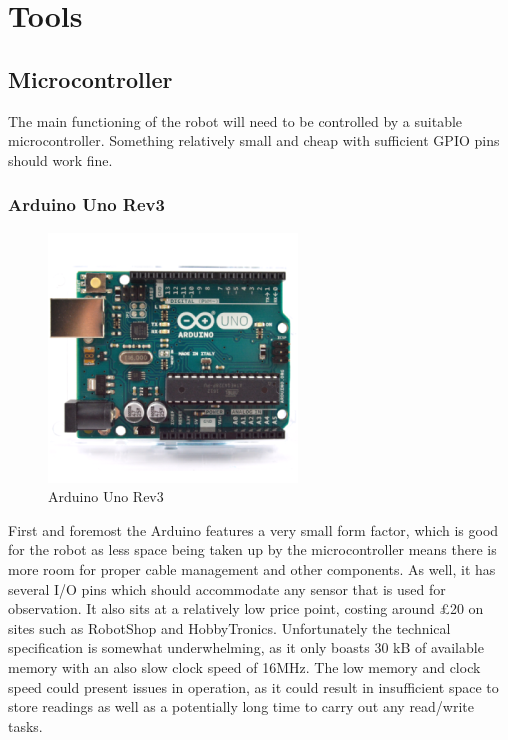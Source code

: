 			\section{Tools}
				\subsection{Microcontroller}
				The main functioning of the robot will need to be controlled by a suitable microcontroller. Something relatively small and cheap with sufficient GPIO pins should work fine.
				
					\subsubsection{Arduino Uno Rev3}
					\begin{figure}[h]
						\centering
						\includegraphics[width=.3\linewidth]{ANALYSIS/arduinounorev3.png}
						\caption{Arduino Uno Rev3}
						\label{fig:arduinounorev3}
					\end{figure}
					First and foremost the Arduino features a very small form factor, which is good for the robot as less space being taken up by the microcontroller means there is more room for proper cable management and other components. As well, it has several I/O pins which should accommodate any sensor that is used for observation. It also sits at a relatively low price point, costing around \pounds{20} on sites such as RobotShop and HobbyTronics. Unfortunately the technical specification is somewhat underwhelming, as it only boasts 30 kB of available memory with an also slow clock speed of 16MHz. The low memory and clock speed could present issues in operation, as it could result in insufficient space to store readings as well as a potentially long time to carry out any read/write tasks.
				
